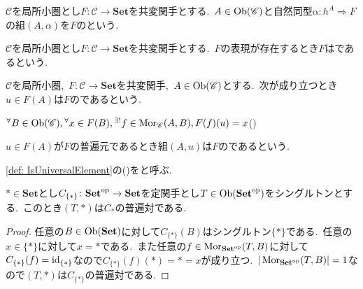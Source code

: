 \begin{definition} \label{def: Representation}
$\mathscr{C}$を局所小圏とし$F \colon \mathscr{C} \to \mathbf{Set}$を共変関手とする.\
$A \in \operatorname{Ob}(\mathscr{C})$と自然同型$\alpha \colon h^A \Rightarrow F$の組$(A, \alpha)$を$F$のという.
\end{definition}

\begin{definition} \label{def: IsRepresentable}
$\mathscr{C}$を局所小圏とし$F \colon \mathscr{C} \to \mathbf{Set}$を共変関手とする.\
$F$の表現が存在するとき$F$はであるという.
\end{definition}

\begin{definition} \label{def: IsUniversalElement}
$\mathscr{C}$を局所小圏,\ $F \colon \mathscr{C} \to \mathbf{Set}$を共変関手,\ $A \in \operatorname{Ob}(\mathscr{C})$とする.\
次が成り立つとき$u \in F(A)$は$F$のであるという.
\begin{center}
${^{\forall}B} \in \operatorname{Ob}(\mathscr{C}), {^{\forall}x} \in F(B), {^{\exists!}f} \in \operatorname{Mor}_\mathscr{C}(A, B), F(f)(u) = x$\qquad(\ast)
\end{center}
$u \in F(A)$が$F$の普遍元であるとき組$(A, u)$は$F$のであるという.
\end{definition}

\begin{definition} \label{def: UniversalProperty}
\cref{def: IsUniversalElement}の(\ast)をと呼ぶ.
\end{definition}

\begin{example} \label{ex: singleton_is_universal_pair}
$\ast \in \mathbf{Set}$とし$C_{\{\ast\}} \colon \mathbf{Set}^{\operatorname{op}} \to \mathbf{Set}$を定関手とし$T \in \operatorname{Ob}(\mathbf{Set}^{\operatorname{op}})$をシングルトンとする.\
このとき$(T, \ast)$は$C_{\ast}$の普遍対である.
\end{example}

\begin{proof}
任意の$B \in \operatorname{Ob}(\mathbf{Set})$に対して$C_{\{\ast\}}(B)$はシングルトン$\{\ast\}$である.\
任意の$x \in \{\ast\}$に対して$x = \ast$である.\
また任意の$f \in \operatorname{Mor}_{\mathbf{Set}^{\operatorname{op}}}(T, B)$に対して$C_{\{\ast\}}(f) = \operatorname{id}_{\{\ast\}}$なので$C_{\{\ast\}}(f)(\ast) = \ast = x$が成り立つ.\
$|\operatorname{Mor}_{\mathbf{Set}^{\operatorname{op}}}(T, B)| = 1$なので$(T, \ast)$は$C_{\{\ast\}}$の普遍対である.
\end{proof}

